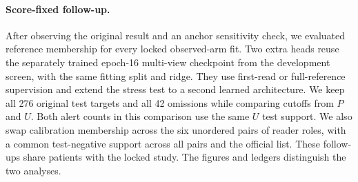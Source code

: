 \paragraph{Score-fixed follow-up.}
After observing the original result and an anchor sensitivity check, we evaluated reference membership for every locked observed-arm fit. Two extra heads reuse the separately trained epoch-16 multi-view checkpoint from the development screen, with the same fitting split and ridge. They use first-read or full-reference supervision and extend the stress test to a second learned architecture. We keep all 276 original test targets and all 42 omissions while comparing cutoffs from $P$ and $U$. Both alert counts in this comparison use the same $U$ test support. We also swap calibration membership across the six unordered pairs of reader roles, with a common test-negative support across all pairs and the official list. These follow-ups share patients with the locked study. The figures and ledgers distinguish the two analyses.
